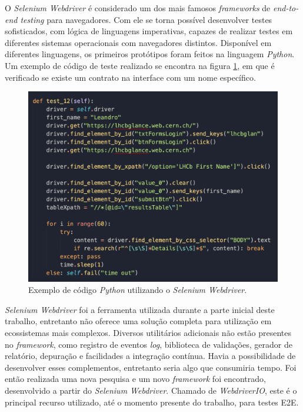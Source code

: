 O \emph{Selenium Webdriver} é considerado um dos mais famosos \emph{frameworks} de \emph{end-to-end testing} para navegadores. Com ele se torna possível desenvolver testes sofisticados, com lógica de linguagens imperativas, capazes de realizar testes em diferentes sistemas operacionais com navegadores distintos. Disponível em diferentes linguagens, os primeiros protótipos foram feitos na linguagem \emph{Python}. Um exemplo de código de teste realizado se encontra na figura \ref{fig:e2e-ferramenta-2}, em que é verificado se existe um contrato na interface com um nome específico.

\begin{figure}[H]
    \centering
    \includegraphics[width=13cm]{source/4-solucao/images/e2e-ferramenta-2.png}
    \caption{Exemplo de código \emph{Python} utilizando o \emph{Selenium Webdriver}.}
    \label{fig:e2e-ferramenta-2}
\end{figure}

\emph{Selenium Webdriver} foi a ferramenta utilizada durante a parte inicial deste trabalho, entretanto não oferece uma solução completa para utilização em ecossistemas mais complexos. Diversos utilitários adicionais não estão presentes no \emph{framework}, como registro de eventos \emph{log}, biblioteca de validações, gerador de relatório, depuração e facilidades a integração contínua. Havia a possibilidade de desenvolver esses complementos, entretanto seria algo que consumiria tempo. Foi então realizada uma nova pesquisa e um novo \emph{framework} foi encontrado, desenvolvido a partir do \emph{Selenium Webdriver}. Chamado de \emph{WebdriverIO}, este é o principal recurso utilizado, até o momento presente do trabalho, para testes E2E.

